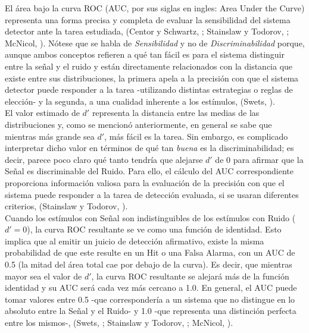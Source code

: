 El área bajo la curva ROC (AUC, por sus siglas en ingles: Area Under the Curve) representa una forma precisa y completa de evaluar la sensibilidad del sistema detector ante la tarea estudiada, (Centor y Schwartz, \citeyear{Centor1985}; Stainslaw y Todorov, \citeyear{Stainslaw1999}; McNicol, \citeyear{McNicol5}). Nótese que se habla de \textit{Sensibilidad} y no de \textit{Discriminabilidad} porque, aunque ambos conceptos refieren a qué tan fácil es para el sistema distinguir entre la señal y el ruido y están directamente relacionados con la distancia que existe entre sus distribuciones, la primera apela a la precisión con que el sistema detector puede responder a la tarea -utilizando distintas estrategias o reglas de elección- y la segunda, a una cualidad inherente a los estímulos, (Swets, \citeyear{Swets1973}).\\

El valor estimado de $d'$ representa la distancia entre las medias de las distribuciones y, como se mencionó anteriormente, en general se sabe que mientras más grande sea $d'$, más fácil es la tarea. Sin embargo, es complicado interpretar dicho valor en términos de qué tan \textit{buena} es la discriminabilidad; es decir, parece poco claro qué tanto tendría que alejarse $d'$ de $0$ para afirmar que la Señal es discriminable del Ruido. Para ello, el cálculo del AUC correspondiente proporciona información valiosa para la evaluación de la precisión con que el sistema puede responder a la tarea de detección evaluada, si se usaran diferentes criterios, (Stainslaw y Todorov, \citeyear{Stainslaw1999}).\\ 

Cuando los estímulos con Señal son indistinguibles de los estímulos con Ruido ($d' = 0$), la curva ROC resultante se ve como una función de identidad. Esto implica que al emitir un juicio de detección afirmativo, existe la misma probabilidad de que este resulte en un Hit o una Falsa Alarma, con un AUC de 0.5 (la mitad del área total cae por debajo de la curva). Es decir, que mientras mayor sea el valor de $d'$, la curva ROC resultante se alejará más de la función identidad y su AUC será cada vez más cercano a 1.0. En general, el AUC puede tomar valores entre 0.5 -que correspondería a un sistema que no distingue en lo absoluto entre la Señal y el Ruido- y 1.0 -que representa una distinción perfecta entre los mismos-, (Swets, \citeyear{Swets1973}; Stainslaw y Todorov, \citeyear{Stainslaw1999}; McNicol, \citeyear{McNicol5}).\\

